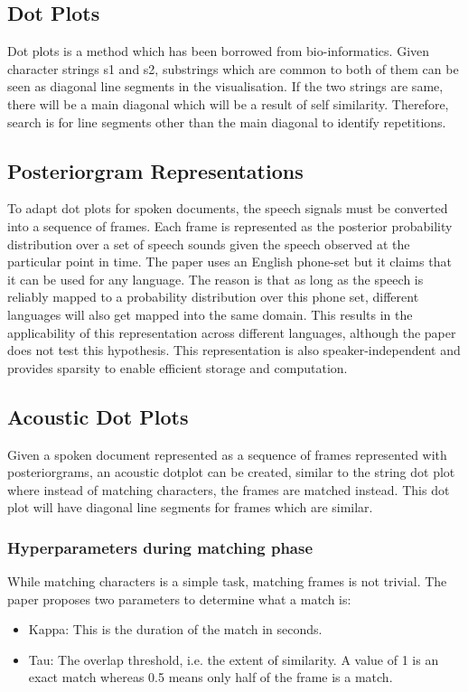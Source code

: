 \documentclass[a4paper]{article}
\begin{document}
\subsection{Dot Plots}
Dot plots is a method which has been borrowed from bio-informatics. Given character strings s1 and s2, substrings which are common to both of them can be seen as diagonal line segments in the visualisation. If the two strings are same, there will be a main diagonal which will be a result of self similarity. Therefore, search is for line segments other than the main diagonal to identify repetitions.

\subsection{Posteriorgram Representations}
To adapt dot plots for spoken documents, the speech signals must be converted into a sequence of frames. Each frame is represented as the posterior probability distribution over a set of speech sounds given the speech observed at the particular point in time. The paper uses an English phone-set but it claims that it can be used for any language. The reason is that as long as the speech is reliably mapped to a probability distribution over this phone set, different languages will also get mapped into the same domain. This results in the applicability of this representation across different languages, although the paper does not test this hypothesis. This representation is also speaker-independent and provides sparsity to enable efficient storage and computation.

\subsection{Acoustic Dot Plots}
Given a spoken document represented as a sequence of frames represented with posteriorgrams, an acoustic dotplot can be created, similar to the string dot plot where instead of matching characters, the frames are matched instead. This dot plot will have diagonal line segments for frames which are similar.

\subsubsection{Hyperparameters during matching phase}
While matching characters is a simple task, matching frames is not trivial. The paper proposes two parameters to determine what a match is:

\begin{itemize}
\item Kappa: This is the duration of the match in seconds.
\item Tau: The overlap threshold, i.e. the extent of similarity. A value of 1 is an exact match whereas 0.5 means only half of the frame is a match.
\end{itemize}
\end{document}

